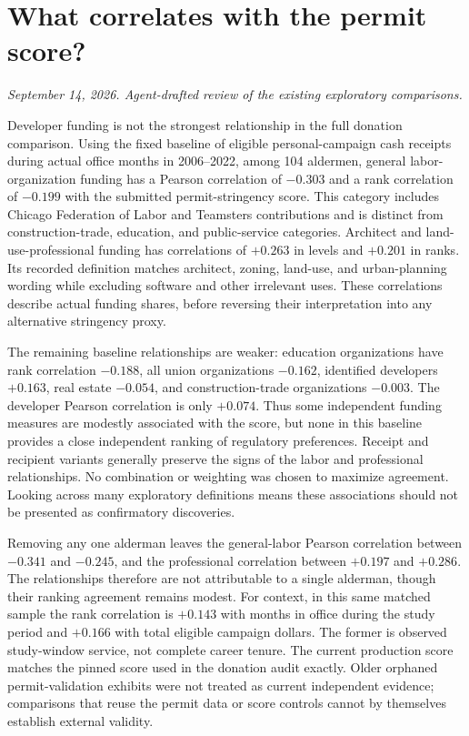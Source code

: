 \clearpage
\section*{What correlates with the permit score?}
\textit{September 14, 2026. Agent-drafted review of the existing exploratory comparisons.}

Developer funding is not the strongest relationship in the full donation comparison. Using the fixed baseline of eligible personal-campaign cash receipts during actual office months in 2006--2022, among 104 aldermen, general labor-organization funding has a Pearson correlation of $-0.303$ and a rank correlation of $-0.199$ with the submitted permit-stringency score. This category includes Chicago Federation of Labor and Teamsters contributions and is distinct from construction-trade, education, and public-service categories. Architect and land-use-professional funding has correlations of $+0.263$ in levels and $+0.201$ in ranks. Its recorded definition matches architect, zoning, land-use, and urban-planning wording while excluding software and other irrelevant uses. These correlations describe actual funding shares, before reversing their interpretation into any alternative stringency proxy.

The remaining baseline relationships are weaker: education organizations have rank correlation $-0.188$, all union organizations $-0.162$, identified developers $+0.163$, real estate $-0.054$, and construction-trade organizations $-0.003$. The developer Pearson correlation is only $+0.074$. Thus some independent funding measures are modestly associated with the score, but none in this baseline provides a close independent ranking of regulatory preferences. Receipt and recipient variants generally preserve the signs of the labor and professional relationships. No combination or weighting was chosen to maximize agreement. Looking across many exploratory definitions means these associations should not be presented as confirmatory discoveries.

Removing any one alderman leaves the general-labor Pearson correlation between $-0.341$ and $-0.245$, and the professional correlation between $+0.197$ and $+0.286$. The relationships therefore are not attributable to a single alderman, though their ranking agreement remains modest. For context, in this same matched sample the rank correlation is $+0.143$ with months in office during the study period and $+0.166$ with total eligible campaign dollars. The former is observed study-window service, not complete career tenure. The current production score matches the pinned score used in the donation audit exactly. Older orphaned permit-validation exhibits were not treated as current independent evidence; comparisons that reuse the permit data or score controls cannot by themselves establish external validity.

